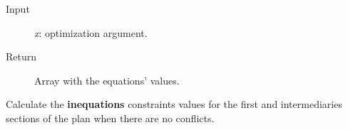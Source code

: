 \documentclass[letterpaper,10pt,english]{sphinxmanual}
\begin{document}
\begin{fulllineitems}
\begin{fulllineitems}
\begin{description}
\item[{Input}] \leavevmode
\emph{x}: optimization argument.

\item[{Return}] \leavevmode
Array with the equations' values.

\end{description}

\end{fulllineitems}


\begin{fulllineitems}
\label{Multi-robot motion planner:planning_sim.Robot._sa_fieqcons}
Calculate the \textbf{inequations} constraints values for the first and intermediaries
sections of the plan when there are no conflicts.


\end{fulllineitems}
\end{fulllineitems}
\end{document}
